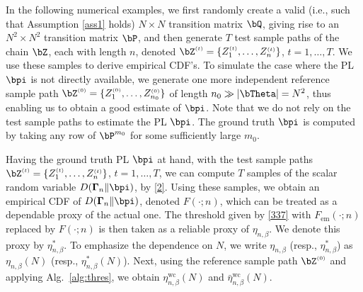 \documentclass[10pt, twocolumn]{IEEEtran}
\begin{document}
In the following numerical examples, we first randomly create a valid
(i.e., such that Assumption \ref{ass1} holds) $N \times N$ transition
matrix $\bQ$, giving rise to an $N^2 \times N^2$ transition matrix
$\bP$, and then generate $T$ {test} sample paths of the chain $\bZ$,
each with length $n$, denoted ${\bZ^{\scriptscriptstyle{( t )}}} = \{
{Z_1^{\scriptscriptstyle{( t )}}, \ldots, Z_n^{\scriptscriptstyle{( t
      )}}}\}$, $t = 1, \ldots ,T$. We use these samples to derive
empirical CDF's. {To simulate the case where the PL $\bpi$ is not
  directly available, we generate one more independent reference sample
  path ${\bZ^{\scriptscriptstyle{( 0 )}}} = \{
  {Z_1^{\scriptscriptstyle{( 0 )}}, \ldots
    ,Z_{n_0}^{\scriptscriptstyle{( 0 )}}} \}$ of length $n_0 \gg
  \left|\bTheta\right| = N^2$, thus enabling us to obtain a good
  estimate of $\bpi$. Note that we do not rely on the test sample paths
  to estimate the PL $\bpi$.} The ground truth $\bpi$ is computed by
taking any row of $\bP^{m_0}$ for some sufficiently large $m_0$.

Having the ground truth PL $\bpi$ at hand, with {the test} sample paths
${\bZ^{\scriptscriptstyle{( t )}}} = \{ {Z_1^{\scriptscriptstyle{( t
      )}}, \ldots ,Z_n^{\scriptscriptstyle{( t )}}} \}$, $t = 1, \ldots,
T$, we can compute $T$ samples of the scalar random variable ${D}(
{{\boldsymbol{\Gamma} _n} \| {{{\bpi}}} } )$, by \eqref{2}. {Using
  these samples}, we obtain an empirical CDF of ${D}(
{{\boldsymbol{\Gamma} _n} \| {{{\bpi}}} } )$, denoted ${F}( \cdot; n )$,
which can be treated as a dependable proxy of the actual one. The
threshold given by \eqref{337} with $F_{\text{em}}(\cdot; n)$ replaced
by $F(\cdot; n)$ is then taken as a reliable proxy of
$\eta_{n,\beta}$. {We denote this proxy by $\eta^{*}_{n,\beta}$. To
  emphasize the dependence on $N$, we write $\eta_{n,\beta}$ (resp.,
  $\eta^{*}_{n,\beta}$) as $\eta_{n,\beta}(N)$ (resp.,
  $\eta^{*}_{n,\beta}(N)$).}  Next, using {the reference} sample path
${\bZ^{\scriptscriptstyle{( 0 )}}}$ and applying Alg.~\ref{alg:thres},
we obtain {$\eta_{n,\beta}^{\text{wc}}(N)$ and $\bar
  \eta_{n,\beta}^{\text{wc}}(N)$}.
\end{document}
